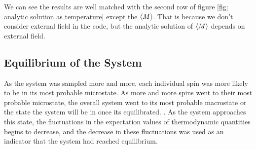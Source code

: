 \documentclass[12pt]{article}
\begin{document}
	We can see the results are well matched with the second row of figure \ref{fig: analytic solution as temperature} except the $\braket{M}$. That is because we don't consider external field in the code, but the analytic solution of $\braket{M}$ depends on external field. 
	
	\subsection{Equilibrium of the System}
	\label{sec: equilibrium of system}
	As the system was sampled more and more, each individual spin
	was more likely to be in its most probable microstate.
	As more and more spins went to their most probable microstate, the overall system went to its most probable macrostate or the state the system will be in once its equilibrated. . As the system approaches this state, the fluctuations in the expectation values of thermodynamic quantities begins to decrease, and the decrease in these fluctuations was used as an indicator that the system
	had reached equilibrium. 
	
\end{document}
